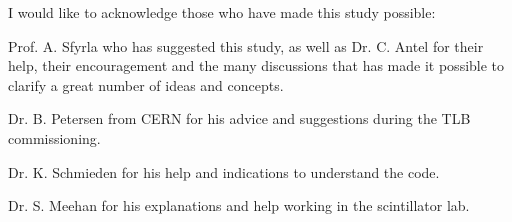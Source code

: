 
\begin{acknowledgements}      


I would like to acknowledge those who have made this study possible:

Prof. A. Sfyrla who has suggested this study, as well as Dr. C. Antel for their help, their encouragement and the many discussions that has made it possible to clarify a great number of ideas and concepts.

Dr. B. Petersen from CERN for his advice and suggestions during the TLB commissioning.

Dr. K. Schmieden for his help and indications to understand the code.

Dr. S. Meehan for his explanations and help working in the scintillator lab.

\end{acknowledgements}

